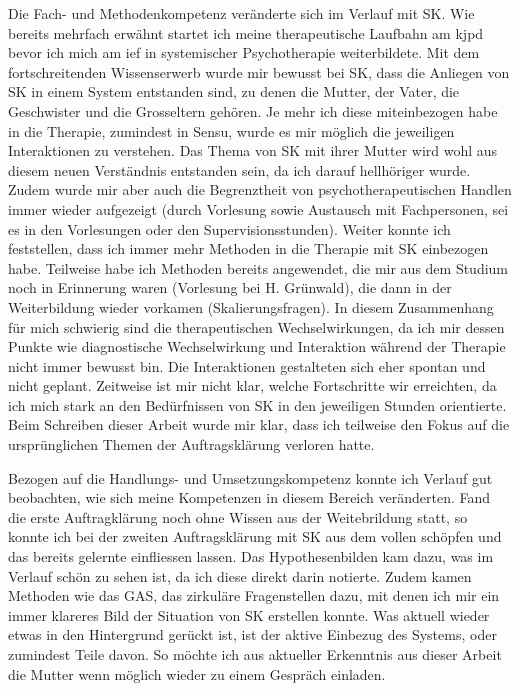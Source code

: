 Die Fach- und Methodenkompetenz veränderte sich im Verlauf mit SK. Wie bereits mehrfach erwähnt startet ich meine therapeutische Laufbahn am \ac{kjpd} bevor ich mich am \ac{ief} in systemischer Psychotherapie weiterbildete. Mit dem fortschreitenden Wissenserwerb wurde mir bewusst bei SK, dass die Anliegen von SK in einem System entstanden sind, zu denen die Mutter, der Vater, die Geschwister und die Grosseltern gehören. Je mehr ich diese miteinbezogen habe in die Therapie, zumindest in Sensu, wurde es mir möglich die jeweiligen Interaktionen zu verstehen. Das Thema von SK mit ihrer Mutter wird wohl aus diesem neuen Verständnis entstanden sein, da ich darauf hellhöriger wurde. Zudem wurde mir aber auch die Begrenztheit von psychotherapeutischen Handlen immer wieder aufgezeigt (durch Vorlesung sowie Austausch mit Fachpersonen, sei es in den Vorlesungen oder den Supervisionsstunden). Weiter konnte ich feststellen, dass ich immer mehr Methoden in die Therapie mit SK einbezogen habe. Teilweise habe ich Methoden bereits angewendet, die mir aus dem Studium noch in Erinnerung waren (Vorlesung bei H. Grünwald), die dann in der Weiterbildung wieder vorkamen (Skalierungsfragen). In diesem Zusammenhang für mich schwierig sind die therapeutischen Wechselwirkungen, da ich mir dessen Punkte wie diagnostische Wechselwirkung und Interaktion während der Therapie nicht immer bewusst bin. Die Interaktionen gestalteten sich eher spontan und nicht geplant. Zeitweise ist mir nicht klar, welche Fortschritte wir erreichten, da ich mich stark an den Bedürfnissen von SK in den jeweiligen Stunden orientierte. Beim Schreiben dieser Arbeit wurde mir klar, dass ich teilweise den Fokus auf die ursprünglichen Themen der Auftragsklärung verloren hatte. 

Bezogen auf die Handlungs- und Umsetzungskompetenz konnte ich Verlauf gut beobachten, wie sich meine Kompetenzen in diesem Bereich veränderten. Fand die erste Auftragklärung noch ohne Wissen aus der Weitebrildung statt, so konnte ich bei der zweiten Auftragsklärung mit SK aus dem vollen schöpfen und das bereits gelernte einfliessen lassen. Das Hypothesenbilden kam dazu, was im Verlauf schön zu sehen ist, da ich diese direkt darin notierte. Zudem kamen Methoden wie das GAS, das zirkuläre Fragenstellen dazu, mit denen ich mir ein immer klareres Bild der Situation von SK erstellen konnte. Was aktuell wieder etwas in den Hintergrund gerückt ist, ist der aktive Einbezug des Systems, oder zumindest Teile davon. So möchte ich aus aktueller Erkenntnis aus dieser Arbeit die Mutter wenn möglich wieder zu einem Gespräch einladen. 

